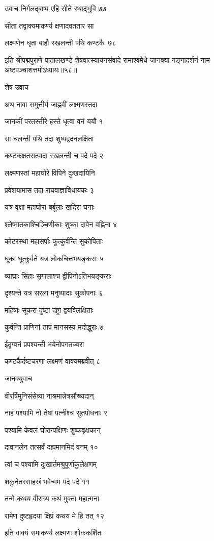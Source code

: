 उवाच निर्गलद्बाष्प एहि सीते रथाद्भुवि ७७

सीता तद्वाक्यमाकर्ण्य क्षणादवततार सा

लक्ष्मणेन धृता बाहौ स्खलन्ती पथि कण्टकैः ७८

इति श्रीपद्मपुराणे पातालखण्डे शेषवात्स्यायनसंवादे रामाश्वमेधे जानक्या गङ्गादर्शनं नाम अष्टपञ्चाशत्तमोऽध्यायः॥५८॥


शेष उवाच

अथ नावा समुत्तीर्य जाह्नवीं लक्ष्मणस्तदा

जानकीं परतस्तीरे हस्ते धृत्वा वनं ययौ १

सा चलन्ती पथि तदा शुष्यद्वदनलक्षिता

कण्टकक्षतसत्पादा स्खलन्ती च पदे पदे २

लक्ष्मणस्तां महाघोरे विपिने दुःखदायिनि

प्रवेशयामास तदा राघवाज्ञाविधायकः ३

यत्र वृक्षा महाघोरा बर्बूलाः खदिरा घनाः

श्लेष्मातकाश्चिञ्चिणीकाः शुष्का दावेन वह्निना ४

कोटरस्था महासर्पाः फूत्कुर्वन्ति सुकोपिताः

घूका घूत्कुर्वते यत्र लोकचित्तभयङ्कराः ५

व्याघ्राः सिंहाः सृगालाश्च द्वीपिनोऽतिभयङ्कराः

दृश्यन्ते यत्र सरला मनुष्यादाः सुकोपनाः ६

महिषाः सूकरा दुष्टा दंष्ट्रा द्वयविलक्षिताः

कुर्वन्ति प्राणिनां तापं मानसस्य मदोद्धुराः ७

ईदृग्वनं प्रपश्यन्ती भयेनोपगतज्वरा

कण्टकैर्दष्टचरणा लक्ष्मणं वाक्यमब्रवीत् ८

जानक्युवाच

वीरर्षिमुनिसंसेव्या नाश्रमान्नेत्रसौख्यदान्

नाहं पश्यामि नो तेषां पत्नीश्च सुतपोधनाः ९

पश्यामि केवलं घोरान्पक्षिणः शुष्कवृक्षकान्

दावानलेन तत्सर्वं दह्यमानमिदं वनम् १०

त्वां च पश्यामि दुःखार्तमश्रुपूर्णाकुलेक्षणम्

शकुनेतरसाहस्रं भवेन्मम पदे पदे ११

तन्मे कथय वीराग्र्य कथं मुक्ता महात्मना

रामेण दुष्टहृदया क्षिप्रं कथय मे हि तत् १२

इति वाक्यं समाकर्ण्य लक्ष्मणः शोककर्शितः

